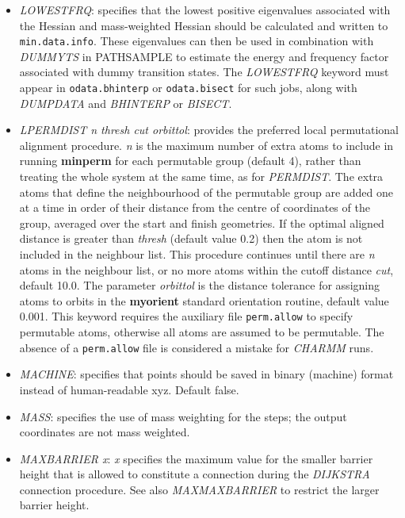 \documentclass[12pt,a4paper,dvips]{article}
\begin{document}
\begin{itemize}
\item {\it LOWESTFRQ\/}: specifies that the lowest positive eigenvalues associated
with the Hessian and mass-weighted Hessian should be calculated and written to {\tt min.data.info\/}.
These eigenvalues can then be used in combination with {\it DUMMYTS\/} in PATHSAMPLE
to estimate the energy and frequency factor associated with dummy transition states.
The {\it LOWESTFRQ\/} keyword must appear in {\tt odata.bhinterp} or {\tt odata.bisect} for
such jobs, along with {\it DUMPDATA\/} and {\it BHINTERP\/} or {\it BISECT\/}.

\item {\it LPERMDIST n thresh cut orbittol\/}: provides the preferred local 
permutational alignment procedure.
{\it n\/} is the maximum number of extra atoms to include in running
{\bf minperm\/} for each permutable group (default 4), rather than
treating the whole system at the same time, as for {\it PERMDIST}.
The extra atoms that define the neighbourhood of the permutable group are 
added one at a time in order of their distance from the centre of coordinates of the
group, averaged over the start and finish geometries.
If the optimal aligned distance is greater than {\it thresh\/} (default value 0.2)
then the atom is not included in the neighbour list.
This procedure continues until there are {\it n\/} atoms in the neighbour list,
or no more atoms within the cutoff distance {\it cut\/}, default 10.0.
The parameter {\it orbittol} is the distance tolerance for assigning atoms to orbits
in the {\bf myorient} standard orientation routine, default value 0.001.
This keyword requires the auxiliary file {\tt perm.allow} to specify permutable atoms, otherwise
all atoms are assumed to be permutable. The absence of a {\tt perm.allow}
file is considered a mistake for {\it CHARMM\/} runs.

\item {\it MACHINE\/}: specifies that points should be saved in binary (machine) format instead 
of human-readable xyz. Default false.

\item {\it MASS\/}: specifies the use of mass weighting for the steps; the 
output coordinates are not mass weighted.

\item {\it MAXBARRIER x\/}: {\it x\/} specifies the maximum value for the smaller barrier height that 
is allowed to constitute a connection during the
{\it DIJKSTRA \/}connection procedure.
See also {\it MAXMAXBARRIER\/} to restrict the larger barrier height.


\end{itemize}
\end{document}
